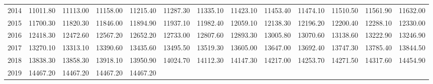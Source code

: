 \begin{longtable}{rrrrrrrrrrrrr}
  2014 & 11011.80 & 11113.00 & 11158.00 & 11215.40 & 11287.30 & 11335.10 & 11423.10 & 11453.40 & 11474.10 & 11510.50 & 11561.90 & 11632.00 \\ 
  2015 & 11700.30 & 11820.30 & 11846.00 & 11894.90 & 11937.10 & 11982.40 & 12059.10 & 12138.30 & 12196.20 & 12200.40 & 12288.10 & 12330.00 \\ 
  2016 & 12418.30 & 12472.60 & 12567.20 & 12652.20 & 12733.00 & 12807.60 & 12893.30 & 13005.80 & 13070.60 & 13138.60 & 13222.90 & 13246.90 \\ 
  2017 & 13270.10 & 13313.10 & 13390.60 & 13435.60 & 13495.50 & 13519.30 & 13605.00 & 13647.00 & 13692.40 & 13747.30 & 13785.40 & 13844.50 \\ 
  2018 & 13838.30 & 13858.30 & 13918.10 & 13950.90 & 14024.70 & 14112.30 & 14147.30 & 14217.00 & 14253.70 & 14271.50 & 14317.60 & 14454.90 \\ 
  2019 & 14467.20 & 14467.20 & 14467.20 & 14467.20 &  &  &  &  &  &  &  &  \\ 
   \hline
\hline
\end{longtable}
